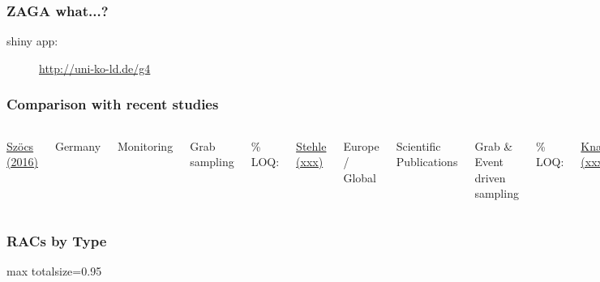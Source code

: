 \documentclass[10pt
	]{beamer}
\begin{document}
\begin{frame}
\frametitle{ZAGA what...?}
\begin{description}
	\item[shiny app: ]{\url{http://uni-ko-ld.de/g4}}
\end{description}

\end{frame}


\begin{frame}
\frametitle{Comparison with recent studies}
\begin{columns}[T]
	    	\underline{Szöcs (2016)}
	        	\item Germany
	        	\item Monitoring
	        	\item Grab sampling \vspace{1.2em}
	        	\item %
	        	\item \% LOQ: 
	        	\item %
	    	\underline{Stehle (xxx)}
	        	\item Europe / Global
	        	\item Scientific Publications
	        	\item Grab \& Event driven sampling
	        	\item %
	        	\item \% LOQ: 
	        	\item
	    	\underline{Knauer (xxx)}
	        	\item Switzerland
	        	\item Monitoring
	        	\item Grab sampling \vspace{1.2em}
	        	\item %
	        	\item \% LOQ: 
	        	\item 
	\end{columns}
\end{frame}


\begin{frame}
\frametitle{RACs by Type}
	\begin{adjustbox}{max totalsize={\textwidth}{0.95\textheight}}
				
	\end{adjustbox}
\end{frame}
\end{document}
